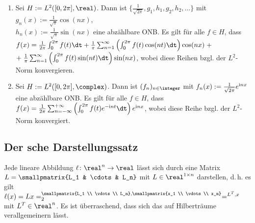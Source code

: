 \begin{Bsp}
    \begin{enumerate}[label=\emph{(\alph*)}]
        \item
        Sei $H := L^2([0, 2\pi], \real)$.
        Dann ist $\{\frac{1}{\sqrt{2\pi}}, g_1, h_1, g_2, h_2, \dotsc\}$
        mit $g_n(x) := \frac{1}{\sqrt{\pi}} \cos(nx)$,\\
        $h_n(x) := \frac{1}{\sqrt{\pi}} \sin(nx)$
        eine abzählbare ONB.
        Es gilt für alle $f \in H$, dass\\
        $f(x) = \frac{1}{2\pi} \int_0^{2\pi} f(t)\dt +
        \frac{1}{\pi} \sum_{n=1}^\infty \left(\int_0^{2\pi} f(t)\cos(nt)\dt\right) \cos(nx) \;+$\\
        $+\; \frac{1}{\pi} \sum_{n=1}^\infty \left(\int_0^{2\pi} f(t)\sin(nt)\dt\right) \sin(nx)$,
        wobei diese Reihen bzgl. der $L^2$-Norm konvergieren.
        
        \item
        Sei $H := L^2([0, 2\pi], \complex)$.
        Dann ist $(f_n)_{n \in \integer}$ mit $f_n(x) := \frac{1}{\sqrt{2\pi}} e^{\mathrm{i} nx}$
        eine abzählbare ONB.
        Es gilt für alle $f \in H$, dass
        $f(x) = \frac{1}{2\pi} \sum_{n=-\infty}^{+\infty}
        \left(\int_0^{2\pi} f(t) e^{-\iu nt} \dt\right) e^{\iu nx}$,
        wobei diese Reihe bzgl. der $L^2$-Norm konvergiert.
    \end{enumerate}
\end{Bsp}

\pagebreak

\subsection{%
    Der sche Darstellungssatz%
}

\begin{Bem}
    Jede lineare Abbildung $\ell\colon \real^n \rightarrow \real$ lässt sich durch eine
    Matrix $L = \smallpmatrix{L_1 & \cdots & L_n}$ mit $L \in \real^{1 \times n}$ darstellen,
    d.\,h. es gilt $\ell(x) = Lx = \sp{\smallpmatrix{L_1 \\ \vdots \\ L_n},
    \smallpmatrix{x_1 \\ \vdots \\ x_n}}_2 = \sp{L^T, x}$ mit $L^T \in \real^n$.
    Es ist überraschend, dass sich das auf Hilberträume verallgemeinern lässt.
\end{Bem}

